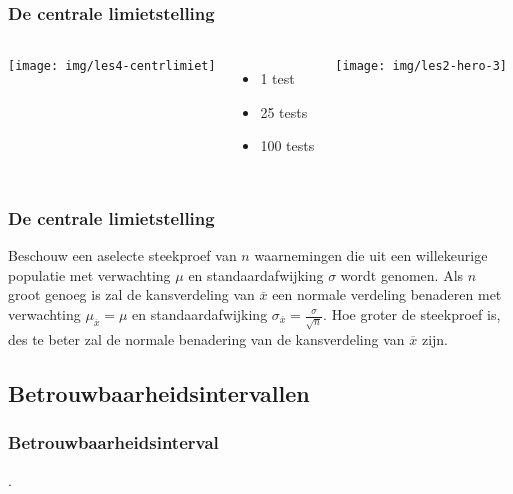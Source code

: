 \begin{frame}
	\frametitle{De centrale limietstelling}
	
	
	\vfill
	
	\begin{columns}[c]
		\texttt{[image: img/les4-centrlimiet]}
		\begin{itemize}
			\item 1 test
			\item 25 tests
			\item 100 tests
		\end{itemize}
		\texttt{[image: img/les2-hero-3]}
	\end{columns}
	
\end{frame}

\begin{frame}
	\frametitle{De centrale limietstelling}
	Beschouw een aselecte steekproef van $n$ waarnemingen die uit een willekeurige populatie met verwachting $\mu$ en standaardafwijking $\sigma$ wordt genomen. Als $n$ groot genoeg is zal de kansverdeling van $\overline{x}$ een normale verdeling benaderen met verwachting $\mu_{\overline{x}} = \mu$ en standaardafwijking $\sigma_{\overline{x}} = \frac{\sigma}{\sqrt{n}}$. Hoe groter de steekproef is, des te beter zal de normale benadering van de kansverdeling van $\overline{x}$ zijn.
\end{frame}

\subsection{Betrouwbaarheidsintervallen}
\begin{frame}
	\frametitle{Betrouwbaarheidsinterval}
	
	.
\end{frame}



